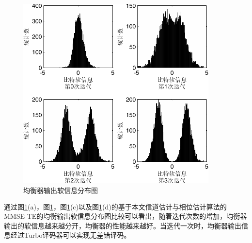 \begin{figure}[htb]
  \begin{center}
    \includegraphics[width=0.9\textwidth]{images/softInfo.pdf}
  \end{center}
  \caption{均衡器输出软信息分布图}
  \label{fig:4.9}
\end{figure}
通过图\ref{fig:4.9}(a)，图\ref{fig:4.9}，图\ref{fig:4.9}(c)以及图\ref{fig:4.9}(d)的基于本文信道估计与相位估计算法的MMSE-TE的均衡输出软信息分布图比较可以看出，随着迭代次数的增加，均衡器输出的软信息越来越分开，均衡器的性能越来越好。当迭代一次时，均衡器输出信息经过Turbo译码器可以实现无差错译码。
